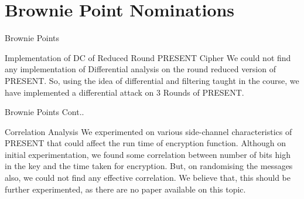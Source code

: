 \section{Brownie Point Nominations}

\begin{frame}{Brownie Points}
\begin{block}{Implementation of DC of Reduced Round PRESENT Cipher}
        We could not find any implementation of Differential analysis on the round reduced version of PRESENT. So, using the idea of differential and filtering taught in the course, we have implemented a differential attack on 3 Rounds of PRESENT. 
\end{block}
\end{frame}
\begin{frame}{Brownie Points Cont..}
    \begin{block}{Correlation Analysis}
        We experimented on various side-channel characteristics of PRESENT that could affect the run time of encryption function. Although on initial experimentation, we found some correlation between number of bits high in the key and the time taken for encryption. But, on randomising the messages also, we could not find any effective correlation. We believe that, this should be further experimented, as there are no paper available on this topic.
\end{block}
\end{frame}